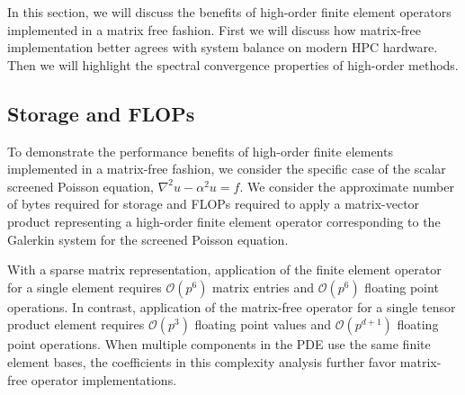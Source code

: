 In this section, we will discuss the benefits of high-order finite element operators implemented in a matrix free fashion.
First we will discuss how matrix-free implementation better agrees with system balance on modern HPC hardware.
Then we will highlight the spectral convergence properties of high-order methods.

\subsection{Storage and FLOPs}

To demonstrate the performance benefits of high-order finite elements implemented in a matrix-free fashion, we consider the specific case of the scalar screened Poisson equation, $\nabla^2 u - \alpha^2 u = f$.
We consider the approximate number of bytes required for storage and FLOPs required to apply a matrix-vector product representing a high-order finite element operator corresponding to the Galerkin system for the screened Poisson equation.

With a sparse matrix representation, application of the finite element operator for a single element requires $\mathcal{O} \left( p^6 \right)$ matrix entries and $\mathcal{O} \left( p^6 \right)$ floating point operations.
In contrast, application of the matrix-free operator for a single tensor product element requires $\mathcal{O} \left( p^3 \right)$ floating point values and $\mathcal{O} \left( p^{d + 1} \right)$ floating point operations.
When multiple components in the PDE use the same finite element bases, the coefficients in this complexity analysis further favor matrix-free operator implementations.


